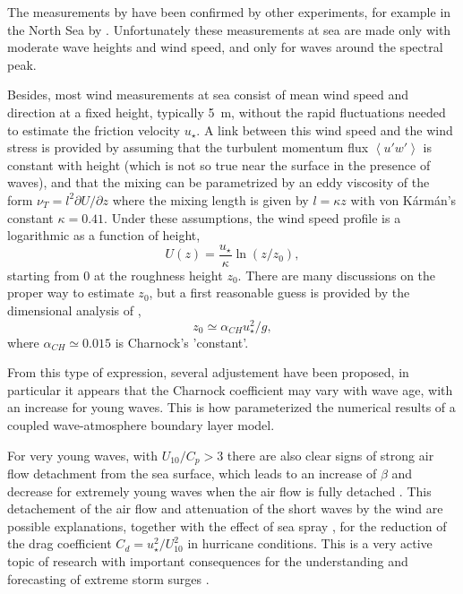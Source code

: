 The measurements by \cite{Snyder&al.1981} have been confirmed by other experiments, for example in the North Sea by \cite{Hasselmann&Bosenberg1991}. 
Unfortunately these measurements at sea are made only with moderate wave heights and wind speed, and only for waves around the spectral peak. 

Besides, most wind measurements at sea consist of mean wind speed and direction at a fixed height, typically 5~m, without the 
rapid fluctuations needed to estimate the friction velocity $u_\star$. A link between this wind speed and the wind stress is provided 
by assuming that the turbulent momentum flux 
$\left<u'w'\right>$ is constant with height (which is not so true near the surface in the presence of waves), and that the mixing can be parametrized 
by an eddy viscosity of the form $\nu_T=l^2
\partial U/\partial z$ where the mixing length is given by $l=\kappa z$
with  von K{\'a}rm{\'a}n's constant $\kappa=0.41$. Under these assumptions, the wind speed profile is a logarithmic as a function of height, 
\begin{equation}
    U\left(z\right)=\frac{u_\star}{\kappa}\ln \left(z/z_0\right),
\end{equation}
starting from $0$ at the roughness height $z_0$. There are many discussions on the proper way to estimate $z_0$, but a first reasonable 
guess is provided by the dimensional analysis of  \cite{Charnock1955}, 
\begin{equation}
    z_0\simeq\alpha_{CH} u_\star ^2/g,
\end{equation}
where $\alpha_{CH} \simeq 0.015$ is Charnock's 'constant'. 

From this type of expression, several adjustement have been proposed, in particular it appears that 
the Charnock coefficient may vary with wave age, with an increase for young waves. This is how  \cite{Janssen1991} parameterized 
the numerical results of a coupled wave-atmosphere boundary layer model. 

For very young waves,  with $U_{10}/C_p > 3$ there are also clear signs of strong air flow detachment from the sea surface, which 
leads to an increase of $\beta$ and decrease for extremely young waves when the air flow is fully detached \citep{Donelan&al.2006,Babanin&al.2007}. 
This detachement of the air flow and attenuation of the short waves by the wind \citep{Soloviev&al.2014} are possible explanations, together with the effect of 
sea spray \citep{Andreas2004}, for the reduction of the drag coefficient $C_d = u_\star^2 / U_{10}^2$ in hurricane conditions. This is a very active topic of research 
with important consequences for the understanding and forecasting of extreme storm surges \citep[e.g.][]{Resio&Westerink2008}. 


